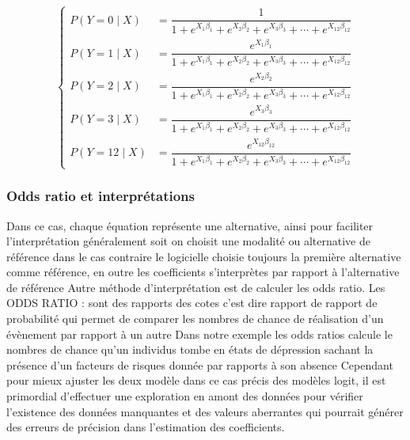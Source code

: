 \documentclass[a4paper]{article}
\begin{document}
 
\begin{equation}
	\left\{
	\begin{aligned}
		P(Y = 0 \mid X) &= \dfrac{1}{1 + e^{X_1 \beta_1} + e^{X_2 \beta_2} + e^{X_3 \beta_3} + \cdots + e^{X_{12} \beta_{12}}} \\ 
		P(Y = 1 \mid X) &= \dfrac{e^{X_1 \beta_1}}{1 + e^{X_1 \beta_1} + e^{X_2 \beta_2} + e^{X_3 \beta_3} + \cdots + e^{X_{12} \beta_{12}}} \\  
		P(Y = 2 \mid X) &= \dfrac{e^{X_2 \beta_2}}{1 + e^{X_1 \beta_1} + e^{X_2 \beta_2} + e^{X_3 \beta_3} + \cdots + e^{X_{12} \beta_{12}}} \\  
		P(Y = 3 \mid X) &= \dfrac{e^{X_3 \beta_3}}{1 + e^{X_1 \beta_1} + e^{X_2 \beta_2} + e^{X_3 \beta_3} + \cdots + e^{X_{12} \beta_{12}}} \\ 
		P(Y = 12 \mid X) &= \dfrac{e^{X_{12} \beta_{12}}}{1 + e^{X_1 \beta_1} + e^{X_2 \beta_2} + e^{X_3 \beta_3} + \cdots + e^{X_{12} \beta_{12}}}
	\end{aligned}
	\right.
\end{equation}





 \subsubsection{Odds ratio et interprétations}
 
 Dans ce cas, chaque équation représente une alternative, ainsi pour faciliter l’interprétation généralement soit on choisit une modalité ou alternative de référence dans le cas contraire le logicielle choisie toujours la première  alternative comme référence, en outre les coefficients s’interprètes par rapport à l’alternative de référence
 Autre méthode d’interprétation est de calculer les odds ratio. Les ODDS RATIO : sont des rapports des cotes c’est dire rapport de rapport de probabilité qui permet de comparer les nombres de chance de réalisation d’un évènement par rapport à un autre 
 Dans notre exemple les odds ratios calcule le nombres de chance qu’un individus tombe en états de dépression  sachant la présence d’un facteurs de risques donnée par rapports à son absence  
 Cependant pour mieux ajuster les deux modèle dans ce cas précis des modèles logit, il est primordial d’effectuer une exploration en amont des données pour vérifier l’existence des données manquantes et des valeurs aberrantes qui pourrait générer des erreurs de précision dans l’estimation des coefficients.
 
\end{document}
